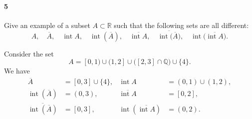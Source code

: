 \documentclass[12pt]{article}
\newlength{\myparskip}
\newenvironment{fullbox}{\begin{lrbox}{\savefullbox}\begin{minipage}{\dimexpr\textwidth-2\fboxsep\relax}\setlength{\parskip}{\myparskip}}{\end{minipage}\end{lrbox}\framebox[\textwidth]{\usebox{\savefullbox}}}
\newenvironment{pbox}[1][]{\begin{fullbox}\ifx#1\empty\else\paragraph{#1}\fi}{\end{fullbox}}
\theoremstyle{definition}
\newcommand{\Q}{\mathbb{Q}}
\newcommand{\<}{\langle}
\renewcommand{\>}{\rangle}
\newcommand{\clo}{\overline}
\DeclareMathOperator{\inter}{int}
\begin{document}
\newpage
\begin{pbox}[5]
    Give an example of a subset $A \subset \mathbb R$ such that the following
      sets are all different:
      \[A, \quad \overline{A}, \quad \inter A, \quad
      \inter\left(\overline A\right), \quad \overline{\inter A}, \quad
      \overline{\inter\bigl(\overline A\bigr)}, \quad
      \inter\bigl(\overline{\inter A}\bigr).\]
\end{pbox}

Consider the set
\[
    A = [0, 1) \cup (1, 2] \cup \big([2, 3] \cap \Q\big) \cup \{4\} .
\]
We have
\begin{align*}
    \clo{A} &= [0, 3] \cup \{4\}, & \inter A &= (0, 1) \cup (1, 2), \\
    \inter(\clo{A}) &= (0, 3), & \clo{\inter A} &= [0, 2], \\
    \clo{\inter(\clo{A})} &= [0, 3], & \inter(\clo{\inter A}) &= (0, 2).
\end{align*}
\end{document}
